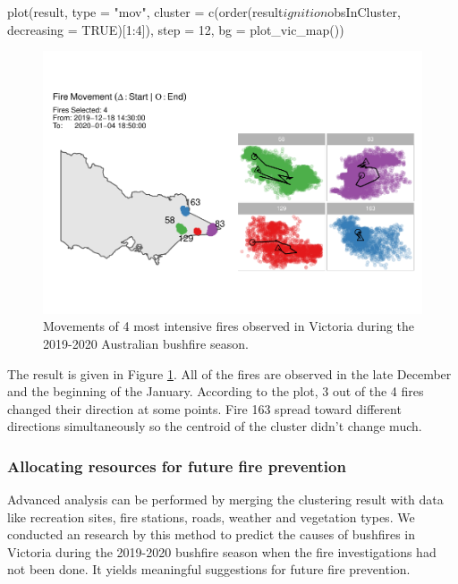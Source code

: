 \begin{Schunk}
\begin{Sinput}
plot(result, 
     type = "mov", 
     cluster = c(order(result$ignition$obsInCluster, 
                       decreasing = TRUE)[1:4]), 
     step = 12, 
     bg = plot_vic_map())
\end{Sinput}
\begin{figure}

{\centering \includegraphics[width=0.8\linewidth]{clustering_paper_files/figure-latex/firemovem-1} 

}

\caption[Movements of 4 most intensive fires observed in Victoria during the 2019-2020 Australian bushfire season]{Movements of 4 most intensive fires observed in Victoria during the 2019-2020 Australian bushfire season.}\label{fig:firemovem}
\end{figure}
\end{Schunk}

The result is given in Figure \ref{fig:firemovem}. All of the fires are
observed in the late December and the beginning of the January.
According to the plot, 3 out of the 4 fires changed their direction at
some points. Fire 163 spread toward different directions simultaneously
so the centroid of the cluster didn't change much.

\hypertarget{allocating-resources-for-future-fire-prevention}{%
\subsubsection{Allocating resources for future fire
prevention}\label{allocating-resources-for-future-fire-prevention}}

Advanced analysis can be performed by merging the clustering result with
data like recreation sites, fire stations, roads, weather and vegetation
types. We conducted an research \citep{conart} by this method to predict
the causes of bushfires in Victoria during the 2019-2020 bushfire season
when the fire investigations had not been done. It yields meaningful
suggestions for future fire prevention.

